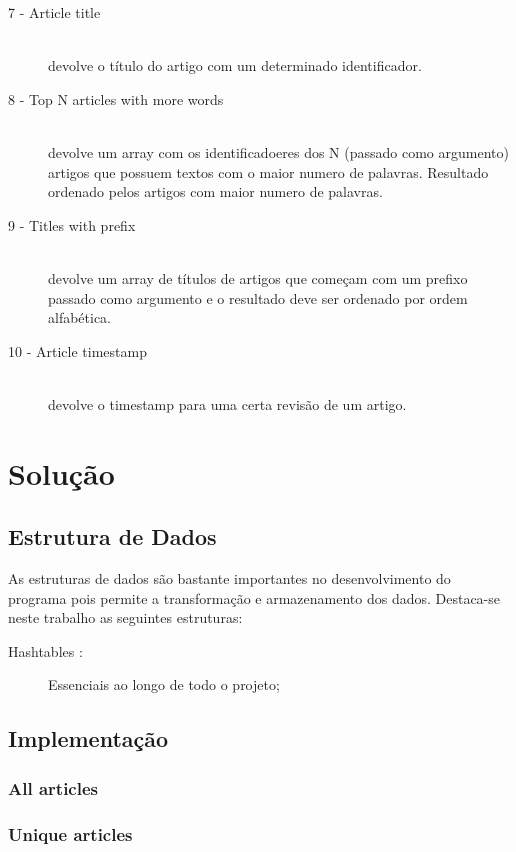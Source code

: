 \documentclass[a4paper]{article}
\begin{document}
\begin{description}
\item[7 - Article title]\hfill \\
devolve o título do artigo com um determinado identificador.
\item[8 - Top N articles with more words]\hfill \\
devolve um array com os identificadoeres dos N (passado como argumento) artigos que possuem textos com o maior numero de palavras. Resultado ordenado pelos artigos com maior numero de palavras.
\item[9 - Titles with prefix]\hfill \\
devolve um array de títulos de artigos que começam com um prefixo passado como argumento e o resultado deve ser ordenado por ordem alfabética.
\item[10 - Article timestamp]\hfill \\
devolve o timestamp para uma certa revisão de um artigo.


\end{description}

\section{Solução}
\label{sec:solucao}

\subsection{Estrutura de Dados}

As estruturas de dados são bastante importantes no desenvolvimento do programa pois permite a transformação e armazenamento dos dados. Destaca-se neste trabalho as seguintes estruturas:

\begin{description}
    \item[Hashtables :] Essenciais ao longo de todo o projeto;
    
\end{description}

\subsection{Implementação}
\subsubsection{All articles}
\subsubsection{Unique articles}
\end{document}
